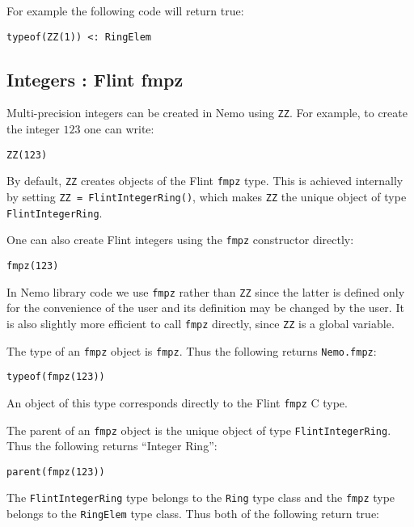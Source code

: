 \documentclass[a4paper,10pt]{article}
\newcommand{\code}{\lstinline}
\begin{document}
For example the following code will return true:

\begin{lstlisting}
typeof(ZZ(1)) <: RingElem
\end{lstlisting}

\subsection{Integers : Flint fmpz}

Multi-precision integers can be created in Nemo using \code{ZZ}. For example, to create the integer
$123$ one can write:

\begin{lstlisting}
ZZ(123)
\end{lstlisting}

By default, \code{ZZ} creates objects of the Flint \code{fmpz} type. This is achieved internally by
setting \code{ZZ = FlintIntegerRing()}, which makes \code{ZZ} the unique object of type
\code{FlintIntegerRing}.

One can also create Flint integers using the \code{fmpz} constructor directly:

\begin{lstlisting}
fmpz(123)
\end{lstlisting}

In Nemo library code we use \code{fmpz} rather than \code{ZZ} since the latter is defined only for the
convenience of the user and its definition may be changed by the user. It is also slightly more
efficient to call \code{fmpz} directly, since \code{ZZ} is a global variable.

The type of an \code{fmpz} object is \code{fmpz}. Thus the following returns \code{Nemo.fmpz}:

\begin{lstlisting}
typeof(fmpz(123))
\end{lstlisting}

An object of this type corresponds directly to the Flint \code{fmpz} C type.

The parent of an \code{fmpz} object is the unique object of type \code{FlintIntegerRing}. Thus the
following returns ``Integer Ring'':

\begin{lstlisting}
parent(fmpz(123))
\end{lstlisting}

The \code{FlintIntegerRing} type belongs to the \code{Ring} type class and the \code{fmpz} type
belongs to the \code{RingElem} type class. Thus both of the following return true:
\end{document}
